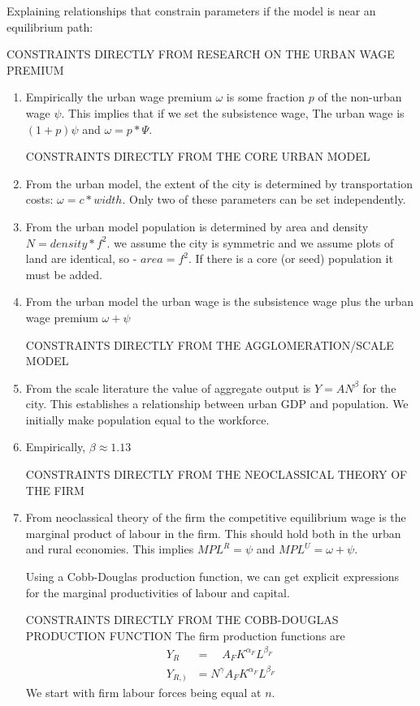 Explaining relationships that constrain parameters if the model is near an equilibrium path: 

CONSTRAINTS DIRECTLY FROM RESEARCH ON THE URBAN WAGE PREMIUM
\begin{enumerate}
     \item  Empirically the urban wage premium  $\omega$ is some fraction $p$ of the non-urban wage $\psi$.   This implies that if we set the subsistence wage, The urban wage is $(1+p)\psi$ and $\omega= p*\Psi$.


CONSTRAINTS DIRECTLY FROM THE CORE URBAN MODEL
    \item From the urban model, the extent of the city is determined by transportation costs:   $\omega =c*width$.  Only two of these parameters can be set independently.

    \item From the urban model population is determined by area and density   $N=density* f^2$. we assume the city is symmetric  and we assume plots  of land are identical, so  - $area=f^2$. If there is a core (or seed) population it must be added.  
   
    \item From the urban model the urban wage is the subsistence wage plus the urban wage premium $\omega+\psi$ 

CONSTRAINTS DIRECTLY FROM THE AGGLOMERATION/SCALE MODEL
    \item From the scale literature the value of aggregate output is $Y=AN^\beta$ for the city. This establishes a relationship between urban GDP and population. We initially make population equal to the workforce. 

    \item Empirically, $\beta \approx 1.13$


CONSTRAINTS DIRECTLY FROM THE NEOCLASSICAL THEORY OF THE FIRM
    \item From neoclassical theory of the firm the competitive equilibrium wage is the  marginal product of labour in the firm.      This should hold both in the urban and rural economies. This implies       $ MPL^R=\psi$  and $ MPL^U=\omega+\psi $.

    Using a Cobb-Douglas production function, we can get explicit expressions for the marginal productivities of labour and capital. 

CONSTRAINTS DIRECTLY FROM THE COBB-DOUGLAS PRODUCTION FUNCTION
The firm production functions are 
\begin{align}
Y_R  &= \quad  A_FK^{\alpha_F}L^{\beta_F}\\
Y_{R, )} &= N^\gamma A_FK^{\alpha_F}L^{\beta_F}
\end{align}
We start with firm labour forces  being equal at $n$.


\end{enumerate}
